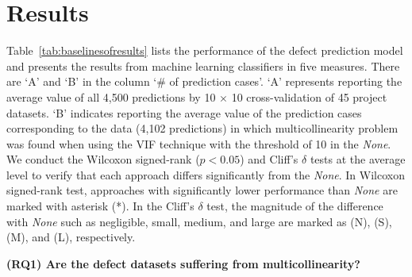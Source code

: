 \chapter{Results}
\thispagestyle{fancy}
\label{sec:result}
% 

\bigskip
Table~\ref{tab:baselinesofresults} lists the performance of the defect prediction model and presents the results from machine learning classifiers in five measures. There are `A' and `B' in the column `\# of prediction cases'. `A' represents reporting the average value of all 4,500 predictions by 10 $\times$ 10 cross-validation of 45 project datasets. `B' indicates reporting the average value of the prediction cases corresponding to the data (4,102 predictions) in which multicollinearity problem was found when using the VIF technique with the threshold of 10 in the \emph{None}. 
We conduct the Wilcoxon signed-rank ($p<0.05$) and Cliff's $\delta$ tests at the average level to verify that each approach differs significantly from the \emph{None}. In Wilcoxon signed-rank test, approaches with significantly lower performance than \emph{None} are marked with asterisk (*). In the Cliff's $\delta$ test, the magnitude of the difference with \emph{None} such as negligible, small, medium, and large are marked as (N), (S), (M), and (L), respectively.
\newline

\noindent \textbf{(RQ1) Are the defect datasets suffering from multicollinearity?}
\label{secRQ1}
\newline

